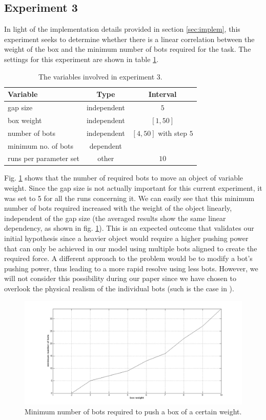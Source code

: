 \subsection{Experiment 3}
\label{ssec:exp3}

In light of the implementation details provided in section \ref{sec:implem}, this experiment seeks to determine whether there is a linear correlation between the weight of the box and the minimum number of bots required for the task. The settings for this experiment are shown in table \ref{tbl:exp3}.

\begin{table}
 \caption{The variables involved in experiment 3.}
 \begin{center}
  \begin{tabular}{| p{5cm} | c | c |}
   \hline
   \centering \textbf{Variable} & \textbf{Type} & \textbf{Interval} \\ \hline
   gap size & independent & $5$ \\ \hline
   box weight & independent & $[1, 50]$ \\ \hline
   number of bots & independent & $[4, 50]$ with step $5$ \\ \hline
   minimum no. of bots & dependent &  \\ \hline
   runs per parameter set & other & $10$ \\ \hline
  \end{tabular}
 \end{center}
 \label{tbl:exp3}
\end{table}

Fig. \ref{fig:minbots} shows that the number of required bots to move an object of variable weight. Since the gap size is not actually important for this current experiment, it was set to 5 for all the runs concerning it. We can easily see that this minimum number of bots required increased with the weight of the object linearly, independent of the gap size (the averaged results show the same linear dependency, as shown in fig. \ref{fig:minbots}). This is an expected outcome that validates our initial hypothesis since a heavier object would require a higher pushing power that can only be achieved in our model using multiple bots aligned to create the required force. A different approach to the problem would be to modify a bot's pushing power, thus leading to a more rapid resolve using less bots. However, we will not consider this possibility during our paper since we have chosen to overlook the physical realism of the individual bots (such is the case in \cite{Yun:2011:OSA:2036628.2036638}).

\begin{figure}[H]
\centerline{\includegraphics[scale=0.4]{images/minimum_no_bots2}}
\caption{Minimum number of bots required to push a box of a certain weight.}
\label{fig:minbots}
\end{figure}
